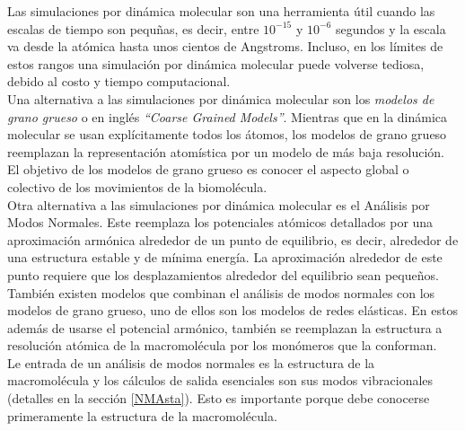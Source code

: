 Las simulaciones por din\'{a}mica molecular son una herramienta \'{u}til cuando las escalas de tiempo son pequ\~{n}as, es decir, entre $10^{-15}$ y  $10^{-6}$ segundos y la escala va desde la at\'{o}mica hasta unos cientos de Angstroms. Incluso, en los l\'{i}mites de estos rangos una simulaci\'{o}n por din\'{a}mica molecular puede volverse tediosa, debido al costo y tiempo computacional.\\

Una alternativa a las simulaciones por din\'{a}mica molecular son los \textit{modelos de grano grueso} o en ingl\'{e}s \textit{``Coarse Grained Models''}.  Mientras que en la din\'{a}mica molecular se usan expl\'{i}citamente todos los \'{a}tomos, los modelos de grano grueso reemplazan la representaci\'{o}n atom\'{i}stica por un modelo de m\'{a}s baja resoluci\'{o}n. El objetivo de los modelos de grano grueso es conocer el aspecto global o colectivo de los movimientos de la biomol\'{e}cula. \\

Otra alternativa a las simulaciones por din\'{a}mica molecular es el An\'{a}lisis por Modos Normales. Este reemplaza los potenciales at\'{o}micos detallados por una aproximaci\'{o}n arm\'{o}nica alrededor de un punto de equilibrio, es decir, alrededor de una estructura estable y de m\'{i}nima energ\'{i}a. La aproximaci\'{o}n alrededor de este punto requiere que los desplazamientos alrededor del equilibrio sean peque\~{n}os.\\

Tambi\'{e}n existen modelos que combinan el an\'{a}lisis de modos normales con los modelos de grano grueso, uno de ellos son los modelos de redes el\'{a}sticas. En estos adem\'{a}s de usarse el potencial arm\'{o}nico, tambi\'{e}n se reemplazan la estructura a resoluci\'{o}n at\'{o}mica de la macromol\'{e}cula por los mon\'{o}meros que la conforman.\\

Le entrada de un an\'{a}lisis de modos normales es la estructura de la macromol\'{e}cula y los c\'{a}lculos de salida esenciales son sus modos vibracionales (detalles en la secci\'{o}n \ref{NMAsta}). Esto es importante porque debe conocerse primeramente la estructura de la macromol\'{e}cula.\\

